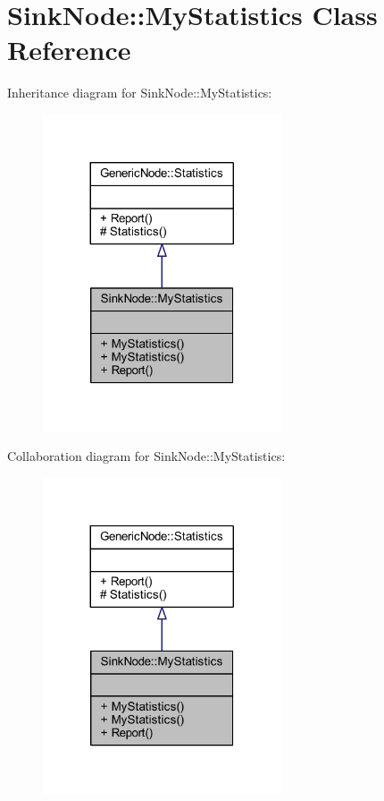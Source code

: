 \hypertarget{class_sink_node_1_1_my_statistics}{}\section{Sink\+Node\+:\+:My\+Statistics Class Reference}
\label{class_sink_node_1_1_my_statistics}


Inheritance diagram for Sink\+Node\+:\+:My\+Statistics\+:\nopagebreak
\begin{figure}[H]
\begin{center}
\leavevmode
\includegraphics[width=200pt]{class_sink_node_1_1_my_statistics__inherit__graph}
\end{center}
\end{figure}


Collaboration diagram for Sink\+Node\+:\+:My\+Statistics\+:\nopagebreak
\begin{figure}[H]
\begin{center}
\leavevmode
\includegraphics[width=200pt]{class_sink_node_1_1_my_statistics__coll__graph}
\end{center}
\end{figure}
